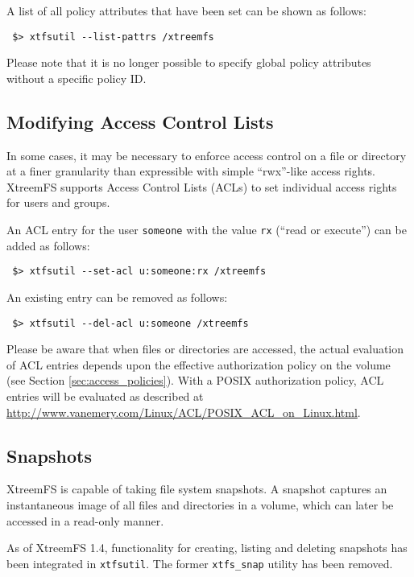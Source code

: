 \documentclass[a4paper,10pt]{book}
\begin{document}
A list of all policy attributes that have been set can be shown as follows:

\begin{verbatim}
 $> xtfsutil --list-pattrs /xtreemfs
\end{verbatim}

Please note that it is no longer possible to specify global policy attributes without a specific policy ID.

\subsection{Modifying Access Control Lists}

In some cases, it may be necessary to enforce access control on a file or directory at a finer granularity than expressible with simple ``rwx''-like access rights. XtreemFS supports Access Control Lists (ACLs) to set individual access rights for users and groups.

An ACL entry for the user \texttt{someone} with the value \texttt{rx} (``read or execute'') can be added as follows:

\begin{verbatim}
 $> xtfsutil --set-acl u:someone:rx /xtreemfs
\end{verbatim}

An existing entry can be removed as follows:

\begin{verbatim}
 $> xtfsutil --del-acl u:someone /xtreemfs
\end{verbatim}

Please be aware that when files or directories are accessed, the actual evaluation of ACL entries depends upon the effective authorization policy on the volume (see Section \ref{sec:access_policies}). With a POSIX authorization policy, ACL entries will be evaluated as described at \href{http://www.vanemery.com/Linux/ACL/POSIX\_ACL\_on\_Linux.html}{http://www.vanemery.com/Linux/ACL/POSIX\_ACL\_on\_Linux.html}.

\subsection{Snapshots}

XtreemFS is capable of taking file system snapshots. A snapshot captures an instantaneous image of all files and directories in a volume, which can later be accessed in a read-only manner.

As of XtreemFS 1.4, functionality for creating, listing and deleting snapshots has been integrated in \texttt{xtfsutil}. The former \texttt{xtfs\_snap} utility has been removed.
\end{document}
